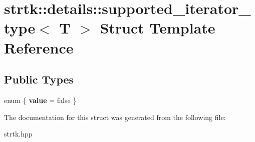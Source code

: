 \hypertarget{structstrtk_1_1details_1_1supported__iterator__type}{\section{strtk\-:\-:details\-:\-:supported\-\_\-iterator\-\_\-type$<$ T $>$ Struct Template Reference}
\label{structstrtk_1_1details_1_1supported__iterator__type}
}
\subsection*{Public Types}
\begin{DoxyCompactItemize}
\item 
enum \{ {\bfseries value} = false
 \}
\end{DoxyCompactItemize}


The documentation for this struct was generated from the following file\-:\begin{DoxyCompactItemize}
\item 
strtk.\-hpp\end{DoxyCompactItemize}
